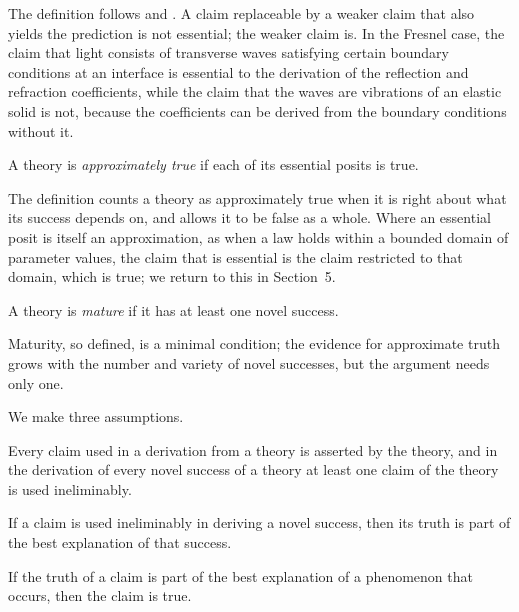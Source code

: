 \documentclass{situationist-preprint}
\begin{document}
The definition follows \citet{Psillos1999} and \citet{Kitcher1993}. A claim replaceable by a weaker claim that also yields the prediction is not essential; the weaker claim is. In the Fresnel case, the claim that light consists of transverse waves satisfying certain boundary conditions at an interface is essential to the derivation of the reflection and refraction coefficients, while the claim that the waves are vibrations of an elastic solid is not, because the coefficients can be derived from the boundary conditions without it.

\begin{definition}\label{d:approx}
A theory is \emph{approximately true} if each of its essential posits is true.
\end{definition}

The definition counts a theory as approximately true when it is right about what its success depends on, and allows it to be false as a whole. Where an essential posit is itself an approximation, as when a law holds within a bounded domain of parameter values, the claim that is essential is the claim restricted to that domain, which is true; we return to this in Section~5.

\begin{definition}[Maturity]\label{d:mature}
A theory is \emph{mature} if it has at least one novel success.
\end{definition}

Maturity, so defined, is a minimal condition; the evidence for approximate truth grows with the number and variety of novel successes, but the argument needs only one.

We make three assumptions.

\begin{assumption}[Use]\label{a:use}
Every claim used in a derivation from a theory is asserted by the theory, and in the derivation of every novel success of a theory at least one claim of the theory is used ineliminably.
\end{assumption}

\begin{assumption}[No miracles]\label{a:nm}
If a claim is used ineliminably in deriving a novel success, then its truth is part of the best explanation of that success.
\end{assumption}

\begin{assumption}\label{a:ibe}
If the truth of a claim is part of the best explanation of a phenomenon that occurs, then the claim is true.
\end{assumption}
\end{document}
